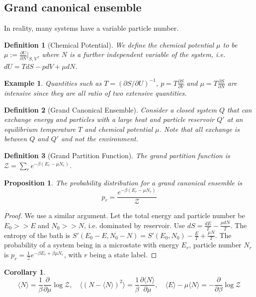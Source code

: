 \documentclass[a4paper]{article}
\newtheorem{eg}{Example}[section]
\theoremstyle{new}
\newtheorem{defi}{Definition}[section]
\newtheorem{prop}{Proposition}[section]
\newtheorem{cor}{Corollary}[section]
\begin{document}
\subsection{Grand canonical ensemble}
In reality, many systems have a variable particle number.
\begin{defi}[Chemical Potential]
We define the chemical potential $\mu$ to be $\mu:=\frac{\partial U}{\partial N}|_{S,V}$, where $N$ is a further independent variable of the system, i.e. $dU=TdS-pdV+\mu dN$.
\end{defi}
\begin{eg}
Quantities such as $T=(\partial S/\partial U)^{-1}$, $p=T\frac{\partial S}{\partial V}$ and $\mu=T\frac{\partial S}{\partial N}$ are intensive since they are all ratio of two extensive quantities.
\end{eg}
\begin{defi}[Grand Canonical Ensemble]
Consider a closed system $Q$ that can exchange energy and particles with a large heat and particle reservoir $Q'$ at an equilibrium temperature $T$ and chemical potential $\mu$. Note that all exchange is between $Q$ and $Q'$ and not the environment.
\end{defi}
\begin{defi}[Grand Partition Function] The grand partition function is $\mathcal{Z}=\sum_re^{-\beta(E_r-\mu N_r)}$.
\end{defi}
\begin{prop}
The probability distribution for a grand canonical ensemble is
\begin{equation}
p_r=\frac{e^{-\beta(E_r-\mu N_r)}}{\mathcal{Z}}\label{grandcanonical}
\end{equation}
\end{prop}
\begin{proof}
We use a similar argument. Let the total energy and particle number be $E_0>>E$ and $N_0>>N$, i.e. dominated by reservoir. Use $dS=\frac{dE}{T}-\frac{\mu dN}{T}$. The entropy of the bath is $S'(E_0-E,N_0-N)=S'(E_0,N_0)-\frac{E}{T}+\frac{\mu N}{T}$. The probability of a system being in a microstate with energy $E_r$, particle number $N_r$ is $p_r=\frac{1}{\mathcal{Z}}e^{-\beta E_r+\beta\mu N_r}$, with $r$ being a state label.
\end{proof}
\begin{cor}
\begin{equation}
\langle N\rangle=\frac{1}{\beta}\frac{\partial}{\partial\mu}\log\mathcal{Z},\quad\langle (N-\langle N\rangle)^2\rangle=\frac{1}{\beta}\frac{\partial\langle N\rangle}{\partial\mu},\quad\langle E\rangle-\mu\langle N\rangle=-\frac{\partial}{\partial\beta}\log\mathcal{Z}\label{grandcanonical2}
\end{equation}
\end{cor}
\end{document}
